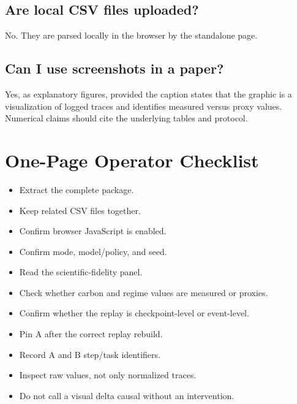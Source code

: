 \documentclass[11pt,a4paper]{article}
\begin{document}
\subsection*{Are local CSV files uploaded?}
No. They are parsed locally in the browser by the standalone page.

\subsection*{Can I use screenshots in a paper?}
Yes, as explanatory figures, provided the caption states that the graphic is a visualization of logged traces and identifies measured versus proxy values. Numerical claims should cite the underlying tables and protocol.

\appendix
\section{One-Page Operator Checklist}

\begin{keybox}
\begin{itemize}
  \item Extract the complete package.
  \item Keep related CSV files together.
  \item Confirm browser JavaScript is enabled.
\end{itemize}
\end{keybox}

\begin{keybox}
\begin{itemize}
  \item Confirm mode, model/policy, and seed.
  \item Read the scientific-fidelity panel.
  \item Check whether carbon and regime values are measured or proxies.
  \item Confirm whether the replay is checkpoint-level or event-level.
\end{itemize}
\end{keybox}

\begin{keybox}
\begin{itemize}
  \item Pin A after the correct replay rebuild.
  \item Record A and B step/task identifiers.
  \item Inspect raw values, not only normalized traces.
  \item Do not call a visual delta causal without an intervention.
\end{itemize}
\end{keybox}
\end{document}
